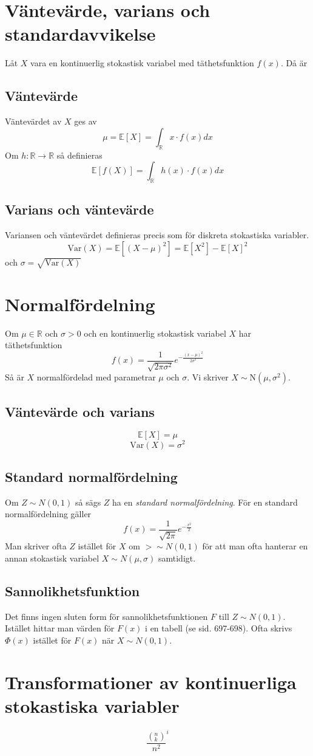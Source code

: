 \section{Väntevärde, varians och standardavvikelse}
Låt $X$ vara en kontinuerlig stokastisk variabel med täthetsfunktion $f(x)$. Då är
\subsection{Väntevärde}
Väntevärdet av $X$ ges av$$
	\mu=\mathbb{E}[X]=\int_\mathbb{R}x\cdot f(x)dx
$$
Om $h:\mathbb{R}\rightarrow\mathbb{R}$ så definieras
$$
	\mathbb{E}[f(X)]=\int_\mathbb{R}h(x)\cdot f(x)dx
$$
\subsection{Varians och väntevärde}
Variansen och väntevärdet definieras precis som för diskreta stokastiska variabler.
$$
	\text{Var}(X)=\mathbb{E}[(X-\mu)^2]=\mathbb{E}[X^2]-\mathbb{E}[X]^2
$$och $\sigma=\sqrt{\text{Var}(X)}$

\section{Normalfördelning}
Om $\mu\in\mathbb{R}$ och $\sigma>0$ och en kontinuerlig stokastisk variabel $X$ har täthetsfunktion $$
	f(x)=\frac{1}{\sqrt{2\pi\sigma^2}}e^{-\frac{(x-\mu)^2}{2\sigma^2}}
$$
Så är $X$ normalfördelad med parametrar $\mu$ och $\sigma$. Vi skriver $X\sim \text{N}(\mu,\sigma^2)$.
\subsection{Väntevärde och varians}
$$
	\mathbb{E}[X]=\mu
$$$$
	\text{Var}(X)=\sigma^2
$$
\subsection{Standard normalfördelning}
Om $Z\sim N(0,1)$ så sägs $Z$ ha en \textit{standard normalfördelning}. För en standard normalfördelning gäller $$
	f(x)=\frac{1}{\sqrt{2\pi}}e^{-\frac{x^2}{2}}
$$
Man skriver ofta $Z$ istället för $X$ om $>\sim N(0,1)$ för att man ofta hanterar en annan stokastisk variabel $X\sim N(\mu,\sigma)$ samtidigt.
\subsection{Sannolikhetsfunktion}
Det finns ingen sluten form för sannolikhetsfunktionen $F$ till $Z\sim N(0,1)$. Istället hittar man värden för $F(x)$ i en tabell (se sid. 697-698). Ofta skrivs $\Phi(x)$ istället för $F(x)$ när $X\sim N(0,1)$.
\section{Transformationer av kontinuerliga stokastiska variabler}
$$
	\frac{\left(^n_k\right)}{n^2}^i
$$
